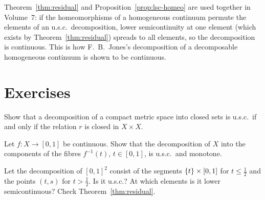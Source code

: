 
\begin{remark}
Theorem~\ref{thm:residual} and Proposition~\ref{prop:lsc-homeo} are used together in Volume~7: if
the homeomorphisms of a homogeneous continuum permute the elements of an u.s.c.\ decomposition,
lower semicontinuity at one element (which exists by Theorem~\ref{thm:residual}) spreads to all
elements, so the decomposition is continuous. This is how F.~B.~Jones's decomposition of a
decomposable homogeneous continuum is shown to be continuous.
\end{remark}

\section*{Exercises}

\begin{exercise}
Show that a decomposition of a compact metric space into closed sets is u.s.c.\ if and only if the
relation $r$ is closed in $X\times X$.
\end{exercise}

\begin{exercise}
Let $f\colon X\to[0,1]$ be continuous. Show that the decomposition of $X$ into the components of
the fibres $f^{-1}(t)$, $t\in[0,1]$, is u.s.c.\ and monotone.
\end{exercise}

\begin{exercise}
Let the decomposition of $[0,1]^2$ consist of the segments $\left\{ t \right\}\times[0,1]$ for $t\le\frac12$ and the
points $(t,s)$ for $t>\frac12$. Is it u.s.c.? At which elements is it lower semicontinuous? Check
Theorem~\ref{thm:residual}.
\end{exercise}
